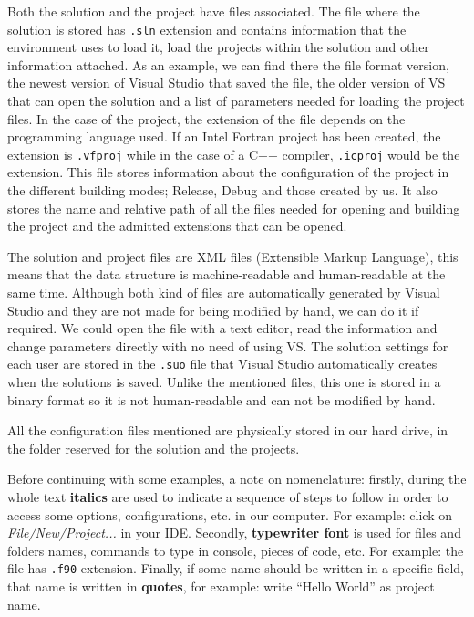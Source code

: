 Both the solution and the project have files associated. The file where the solution is stored has \texttt{.sln} extension and contains information that the environment uses to load it, load the projects within the solution and other information attached. As an example, we can find there the file format version, the newest version of Visual Studio that saved the file, the older version of VS that can open the solution and a list of parameters needed for loading the project files. In the case of the project, the extension of the file depends on the programming language used. If an Intel Fortran project has been created, the extension is \texttt{.vfproj} while in the case of a C++ compiler, \texttt{.icproj} would be the extension. This file stores information about the configuration of the project in the different building modes; Release, Debug and those created by us. It also stores the name and relative path of all the files needed for opening and building the project and the admitted extensions that can be opened. 

The solution and project files are XML files (Extensible Markup Language), this means that the data structure is machine-readable and human-readable at the same time. Although both kind of files are automatically generated by Visual Studio and they are not made for being modified by hand, we can do it if required. We could open the file with a text editor, read the information and change parameters directly with no need of using VS. The solution settings for each user are stored in the \texttt{.suo} file that Visual Studio automatically creates when the solutions is saved. Unlike the mentioned files, this one is stored in a binary format so it is not human-readable and can not be modified by hand. 

All the configuration files mentioned are physically stored in our hard drive, in the folder reserved for the solution and the projects.

Before continuing with some examples, a note on nomenclature: firstly, during the whole text \textbf{italics} are used to indicate a sequence of steps to follow in order to access some options, configurations, etc. in our computer. For example: click on \textit{File/New/Project...} in your IDE. 
Secondly, \textbf{typewriter font} is used for files and folders names, commands to type in console, pieces of code, etc. For example: the file has \texttt{.f90} extension. 
Finally, if some name should be written in a specific field, that name is written in \textbf{quotes}, for example: write ``Hello World'' as project name. 


